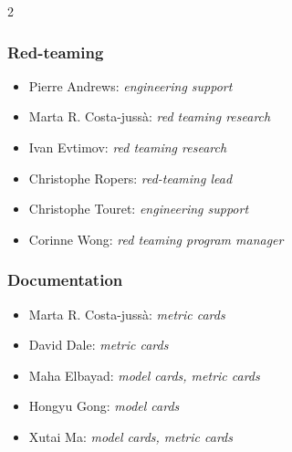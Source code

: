 \begin{multicols}{2}
\columnbreak

\subsubsection*{Red-teaming}
\begin{itemize}[itemsep=0.00cm,parsep=0.0cm,left=0pt, label={}]
\item Pierre Andrews: \textit{engineering support}
\item Marta R. Costa-jussà: \textit{red teaming research}
\item Ivan Evtimov: \textit{red teaming research}
\item Christophe Ropers: \textit{red-teaming lead}
\item Christophe Touret: \textit{engineering support }
\item Corinne Wong: \textit{red teaming program manager}
\end{itemize}

\subsubsection*{Documentation}
\begin{itemize}[itemsep=0.00cm,parsep=0.0cm,left=0pt, label={}]
\item Marta R. Costa-jussà: \textit{metric cards}
\item David Dale: \textit{metric cards}
\item Maha Elbayad: \textit{model cards, metric cards}
\item Hongyu Gong: \textit{model cards}
\item Xutai Ma: \textit{model cards, metric cards}
 \end{itemize}

\end{multicols}

\vspace{10pt}


